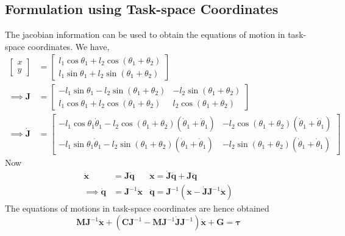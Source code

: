 \subsection{Formulation using Task-space Coordinates}
The jacobian information can be used to obtain the equations of motion in task-space coordinates.
We have,
\begin{align*}
	\begin{bmatrix}
		x\\
		y
	\end{bmatrix} &= \begin{bmatrix}
	l_1\cos\theta_1 + l_2\cos\left(\theta_1 + \theta_2\right) \\
	l_1\sin\theta_1 + l_2\sin\left(\theta_1 + \theta_2\right)
\end{bmatrix}\\
\implies \bm{J} &= \begin{bmatrix}
	-l_1\sin\theta_1 - l_2\sin\left(\theta_1+\theta_2\right) & -l_2\sin\left(\theta_1 + \theta_2\right)\\
	l_1\cos\theta_1 + l_2\cos\left(\theta_1+\theta_2\right) & l_2\cos\left(\theta_1 + \theta_2\right)
\end{bmatrix}\\
\implies \dot{\bm{J}} &= \begin{bmatrix}
	-l_1\cos\theta_1\dot{\theta}_1 - l_2\cos\left(\theta_1+\theta_2\right)\left(\dot{\theta}_1 + \dot{\theta}_1\right) & -l_2\cos\left(\theta_1 + \theta_2\right)\left(\dot{\theta}_1 + \dot{\theta}_1\right)\\
	-l_1\sin\theta_1\dot{\theta}_1 - l_2\sin\left(\theta_1+\theta_2\right)\left(\dot{\theta}_1 + \dot{\theta}_1\right) & -l_2\sin\left(\theta_1 + \theta_2\right)\left(\dot{\theta}_1 + \dot{\theta}_1\right)
\end{bmatrix}
\end{align*}
Now
\begin{align*}
	\dot{\bm{x}} &= \bm{J}\dot{\bm{q}} & \ddot{\bm{x}} = \dot{\bm{J}}\dot{\bm{q}} + \bm{J}\ddot{\bm{q}} \\
	\implies \dot{\bm{q}} &= \bm{J}^{-1}\dot{\bm{x}} & \ddot{\bm{q}} = \bm{J}^{-1}\left(\ddot{\bm{x}} - \dot{\bm{J}}\bm{J}^{-1}\dot{\bm{x}}\right)
\end{align*}
The equations of motions in task-space coordinates are hence obtained
\begin{equation*}
	\bm{M}\bm{J}^{-1}\ddot{\bm{x}} + \left(\bm{C}\bm{J}^{-1} - \bm{M}\bm{J}^{-1} \dot{\bm{J}}\bm{J}^{-1}\right)\dot{\bm{x}} + \bm{G} = \bm{\tau}
\end{equation*}
